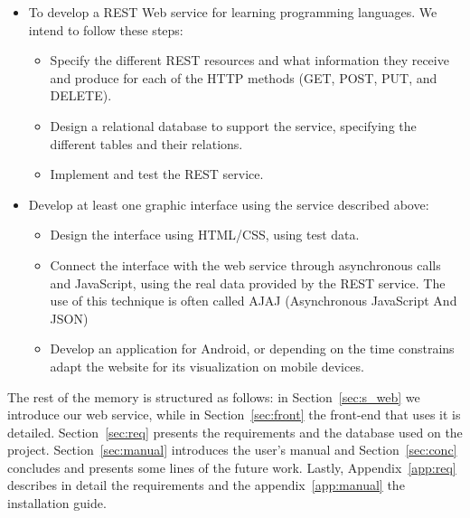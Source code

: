 \begin{itemize}
\item
To develop a REST Web service for learning programming languages. We intend to follow these steps:

\begin{itemize}
\item
Specify the different REST resources and what information they receive and produce for each of the HTTP methods (GET, POST, PUT, and DELETE).

\item
Design a relational database to support the service, specifying the different tables and their relations.

\item
Implement and test the REST service.

\end{itemize}

\item
Develop at least one graphic interface using the service described above:

\begin{itemize}
\item
Design the interface using HTML/CSS, using test data.

\item
Connect the interface with the web service through asynchronous calls and JavaScript, using the real data provided by the REST service. The use of this technique is often called AJAJ (Asynchronous JavaScript And JSON)

\item
Develop an application for Android, or depending on the time constrains adapt the website for its visualization on mobile devices.

\end{itemize}

\end{itemize}

The rest of the memory is structured as follows: in Section~\ref{sec:s_web} we introduce our web service, while in Section~\ref{sec:front} the front-end that uses it is detailed.
Section~\ref{sec:req} presents the requirements and the database used on the project. Section~\ref{sec:manual} introduces the user's manual and Section~\ref{sec:conc} concludes and presents some lines of the future work.
Lastly, Appendix~\ref{app:req} describes in detail the requirements and the appendix~\ref{app:manual} the installation guide.